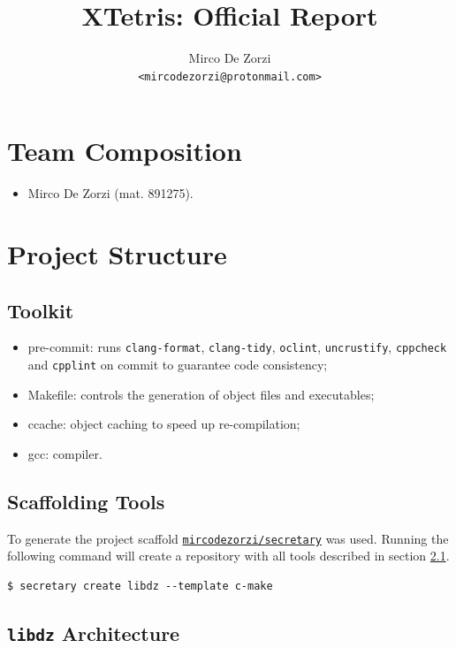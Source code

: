 \documentclass{report}
\title{XTetris: Official Report}
\author{Mirco De Zorzi \\ \texttt{<mircodezorzi@protonmail.com>}}
\date{}
\begin{document}
\maketitle

\section{Team Composition}

\begin{itemize}
  \item Mirco De Zorzi (mat. 891275).
\end{itemize}

\section{Project Structure}

\subsection{Toolkit}
\label{ssec:toolchain}

\begin{itemize}
  \item pre-commit: runs \texttt{clang-format}, \texttt{clang-tidy}, \texttt{oclint}, \texttt{uncrustify}, \texttt{cppcheck} and \texttt{cpplint} on commit to guarantee code consistency;
  \item Makefile: controls the generation of object files and executables;
  \item ccache: object caching to speed up re-compilation;
  \item gcc: compiler.
\end{itemize}

\subsection{Scaffolding Tools}

To generate the project scaffold \href{https://github.com/mircodezorzi/secretary}{\texttt{mircodezorzi/secretary}} was used. Running the following command will create a repository with all tools described in section \ref{ssec:toolchain}.

\begin{verbatim}
$ secretary create libdz --template c-make
\end{verbatim}

\subsection{\texttt{libdz} Architecture}
\end{document}
